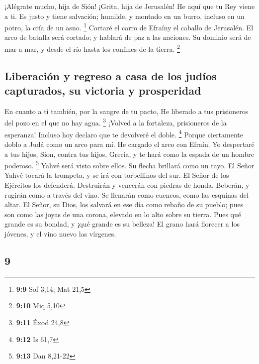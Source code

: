\begin{paracol}{2}
 ¡Alégrate mucho, hija de Sión! ¡Grita, hija de Jerusalén!
He aquí que tu Rey viene a ti. Es justo y tiene salvación; humilde, y
montado en un burro, incluso en un potro, la cría de un asno.
\footnote{\textbf{9:9} Sof 3,14; Mat 21,5}  Cortaré el
carro de Efraíny el caballo de Jerusalén. El arco de batalla será
cortado; y hablará de paz a las naciones. Su dominio será de mar a mar,
y desde el río hasta los confines de la tierra. \footnote{\textbf{9:10}
  Miq 5,10}

\hypertarget{liberaciuxf3n-y-regreso-a-casa-de-los-juduxedos-capturados-su-victoria-y-prosperidad}{%
\subsection{Liberación y regreso a casa de los judíos capturados, su
victoria y
prosperidad}\label{liberaciuxf3n-y-regreso-a-casa-de-los-juduxedos-capturados-su-victoria-y-prosperidad}}

 En cuanto a ti también, por la sangre de tu pacto, He
liberado a tus prisioneros del pozo en el que no hay agua. \footnote{\textbf{9:11}
  Éxod 24,8}  ¡Volved a la fortaleza, prisioneros de la
esperanza! Incluso hoy declaro que te devolveré el doble. \footnote{\textbf{9:12}
  Is 61,7}  Porque ciertamente doblo a Judá como un arco
para mí. He cargado el arco con Efraín. Yo despertaré a tus hijos, Sion,
contra tus hijos, Grecia, y te hará como la espada de un hombre
poderoso. \footnote{\textbf{9:13} Dan 8,21-22}  Yahvé
será visto sobre ellos. Su flecha brillará como un rayo. El Señor Yahvé
tocará la trompeta, y se irá con torbellinos del sur.  El
Señor de los Ejércitos los defenderá. Destruirán y vencerán con piedras
de honda. Beberán, y rugirán como a través del vino. Se llenarán como
cuencos, como las esquinas del altar.  El Señor, su Dios,
los salvará en ese día como rebaño de su pueblo; pues son como las joyas
de una corona, elevado en lo alto sobre su tierra.  Pues
qué grande es su bondad, y ¡qué grande es su belleza! El grano hará
florecer a los jóvenes, y el vino nuevo las vírgenes.

\switchcolumn
\begin{otherlanguage}{english}

\hypertarget{section-17}{%
\section{9}\label{section-17}}


\end{otherlanguage}
\end{paracol}
